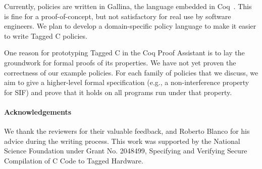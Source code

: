 \documentclass{llncs}
\begin{document}
Currently, policies are written in Gallina, the language embedded in Coq~\cite{coq}. This is fine for a
proof-of-concept, but not satisfactory for real use by software engineers.
We plan to develop a domain-specific policy language to make it easier to write Tagged C policies.

One reason for prototyping Tagged C in the Coq Proof Assistant is to lay the groundwork
for formal proofs of its properties. We have not yet proven the correctness of our example
policies. For each family of policies that we discuss, we aim to give a higher-level formal
specification (e.g., a non-interference property for SIF) and prove that it holds on all
programs run under that property.

\paragraph{Acknowledgements}

We thank the reviewers for their valuable feedback, and Roberto Blanco for his advice during
the writing process. This work was supported by the National Science Foundation under
Grant No. 2048499, Specifying and Verifying Secure Compilation of C Code to Tagged Hardware.



  
\end{document}
